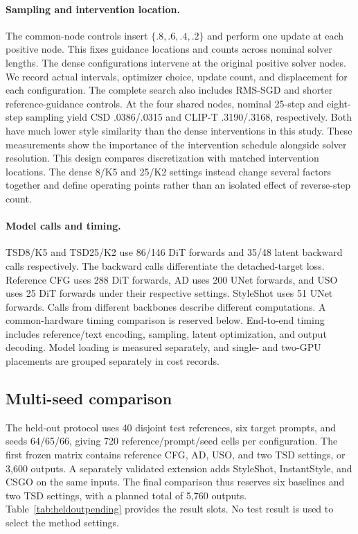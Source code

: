 \paragraph{Sampling and intervention location.}
The common-node controls insert $\{.8,.6,.4,.2\}$ and perform one update
at each positive node. This fixes guidance locations and counts across
nominal solver lengths. The dense configurations intervene at the original
positive solver nodes. We record actual intervals, optimizer choice,
update count, and displacement for each configuration. The complete search
also includes RMS-SGD and shorter reference-guidance controls. At the four
shared nodes, nominal 25-step and eight-step sampling yield CSD
.0386/.0315 and CLIP-T .3190/.3168, respectively. Both have much lower
style similarity than the dense interventions in this study. These
measurements show the importance of the intervention schedule alongside
solver resolution. This design
compares discretization with matched intervention locations. The dense
8/K5 and 25/K2 settings instead change several factors together and define
operating points rather than an isolated effect of reverse-step count.

\paragraph{Model calls and timing.}
TSD8/K5 and TSD25/K2 use 86/146 DiT forwards and 35/48 latent backward
calls respectively. The backward calls differentiate the detached-target
loss. Reference CFG uses 288 DiT forwards, AD uses 200 UNet forwards, and
USO uses 25 DiT forwards under their respective settings. StyleShot uses
51 UNet forwards. Calls from
different backbones describe different computations. A common-hardware
timing comparison is reserved below.
End-to-end timing includes reference/text encoding, sampling, latent
optimization, and output decoding. Model loading is measured separately,
and single- and two-GPU placements are grouped separately in cost records.


\subsection{Multi-seed comparison}
\label{sec:expanded}
The held-out protocol uses 40 disjoint test references, six target prompts,
and seeds 64/65/66, giving 720 reference/prompt/seed cells per configuration.
The first frozen matrix contains reference CFG, AD, USO, and two TSD
settings, or 3,600 outputs. A separately validated extension adds StyleShot,
InstantStyle, and CSGO on the same inputs. The final comparison thus reserves
six baselines and two TSD settings, with a planned total of 5,760 outputs.
Table~\ref{tab:heldoutpending} provides the result slots. No test result is
used to select the method settings.

